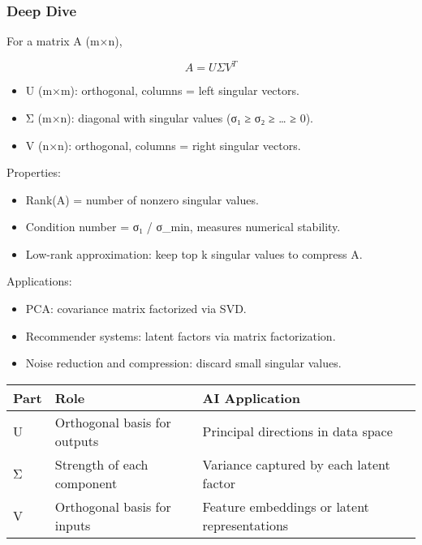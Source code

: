 \documentclass[
  letterpaper,
  DIV=11,
  numbers=noendperiod]{scrreprt}
\providecommand{\tightlist}{%
  \setlength{\itemsep}{0pt}\setlength{\parskip}{0pt}}
\begin{document}
\subsubsection{Deep Dive}\label{deep-dive-107}

For a matrix A (m×n),

\[
A = U \Sigma V^T
\]

\begin{itemize}
\tightlist
\item
  U (m×m): orthogonal, columns = left singular vectors.
\item
  Σ (m×n): diagonal with singular values (σ₁ ≥ σ₂ ≥ \ldots{} ≥ 0).
\item
  V (n×n): orthogonal, columns = right singular vectors.
\end{itemize}

Properties:

\begin{itemize}
\tightlist
\item
  Rank(A) = number of nonzero singular values.
\item
  Condition number = σ₁ / σ\_min, measures numerical stability.
\item
  Low-rank approximation: keep top k singular values to compress A.
\end{itemize}

Applications:

\begin{itemize}
\tightlist
\item
  PCA: covariance matrix factorized via SVD.
\item
  Recommender systems: latent factors via matrix factorization.
\item
  Noise reduction and compression: discard small singular values.
\end{itemize}

\begin{longtable}[]{@{}
  >{\raggedright\arraybackslash}p{}
  >{\raggedright\arraybackslash}p{}
  >{\raggedright\arraybackslash}p{}@{}}
\toprule\noalign{}
\begin{minipage}[b]{\linewidth}\raggedright
Part
\end{minipage} & \begin{minipage}[b]{\linewidth}\raggedright
Role
\end{minipage} & \begin{minipage}[b]{\linewidth}\raggedright
AI Application
\end{minipage} \\
\midrule\noalign{}
\endhead
\bottomrule\noalign{}
\endlastfoot
U & Orthogonal basis for outputs & Principal directions in data space \\
Σ & Strength of each component & Variance captured by each latent
factor \\
V & Orthogonal basis for inputs & Feature embeddings or latent
representations \\
\end{longtable}
\end{document}
